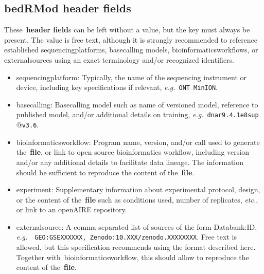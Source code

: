 \documentclass[11pt]{article}
\begin{document}
\subsection{\acs{bedRMod} header fields}
These~\textbf{header field}s can be left without a value, but the key must always be present. The value is free text, although it is strongly recommended
to reference established \textsf{sequencing\textunderscore platform}s, \textsf{basecalling} models, \textsf{bioinformatics\textunderscore workflow}s, or \textsf{external\textunderscore source}s using an exact terminology and/or recognized identifiers.  
\begin{itemize}
\item \textsf{sequencing\textunderscore platform}: Typically, the name of the sequencing instrument or device, including key specifications if relevant, \textit{e.g.}~\texttt{ONT MinION}.

\item \textsf{basecalling}: Basecalling model such as name of versioned model, reference to published model, and/or additional details on training, \textit{e.g.}~\texttt{dna\textunderscore r9.4.1\textunderscore e8\textunderscore sup$@$v3.6}.

\item \textsf{bioinformatics\textunderscore workflow}: Program name, version, and/or call used to generate the~\textbf{file}, or link to open source bioinformatics workflow, including version and/or any additional details to facilitate data lineage. The information should be sufficient to reproduce the content of the~\textbf{file}.

\item \textsf{experiment}: Supplementary information about experimental protocol, design, or the content of the~\textbf{file} such as conditions used, number of replicates, \textit{etc.}, or link to an openAIRE repository.

\item \textsf{external\textunderscore source}: A comma-separated list of sources of the form Databank:ID, \textit{e.g.}~~\texttt{GEO:GSEXXXXXX, Zenodo:10.XXX/zenodo.XXXXXXXX}. Free text is allowed, but this specification recommends using the format described here. Together with~\textsf{bioinformatics\textunderscore workflow}, this should allow to reproduce the content of the~\textbf{file}.
\end{itemize}
\end{document}
